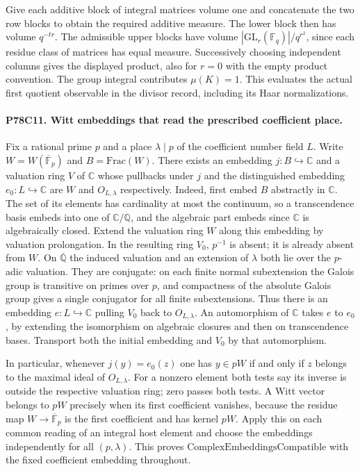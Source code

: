 Give each additive block of integral matrices volume one and concatenate
the two row blocks to obtain the required additive measure. The lower
block then has volume $q^{-tr}$. The admissible upper blocks have
volume $|\mathrm{GL}_r(\mathbb F_q)|/q^{r^2}$, since each residue
class of matrices has equal measure. Successively choosing independent
columns gives the displayed product, also for $r=0$ with the empty
product convention. The group integral contributes $\mu(K)=1$.
This evaluates the actual first quotient observable in the divisor
record, including its Haar normalizations.

\paragraph{P78C11. Witt embeddings that read the prescribed coefficient place.}
Fix a rational prime $p$ and a place $\lambda\mid p$ of the coefficient
number field $L$. Write $W=W(\overline{\mathbb F}_p)$ and $B=\mathrm{Frac}(W)$.
There exists an embedding $j:B\hookrightarrow\mathbb C$ and a valuation
ring $V$ of $\mathbb C$ whose pullbacks under $j$ and the distinguished
embedding $e_0:L\hookrightarrow\mathbb C$ are $W$ and $O_{L,\lambda}$
respectively. Indeed, first embed $B$ abstractly in $\mathbb C$.
The set of its elements has cardinality at most the continuum, so a
transcendence basis embeds into one of $\mathbb C/\mathbb Q$, and the
algebraic part embeds since $\mathbb C$ is algebraically closed. Extend
the valuation ring $W$ along this embedding by valuation prolongation.
In the resulting ring $V_0$, $p^{-1}$ is absent; it is already absent
from $W$. On $\overline{\mathbb Q}$ the induced valuation and an
extension of $\lambda$ both lie over the $p$-adic valuation. They
are conjugate: on each finite normal subextension the Galois group is
transitive on primes over $p$, and compactness of the absolute Galois
group gives a single conjugator for all finite subextensions. Thus
there is an embedding $e:L\hookrightarrow\mathbb C$ pulling $V_0$
back to $O_{L,\lambda}$. An automorphism of $\mathbb C$ takes $e$ to
$e_0$, by extending the isomorphism on algebraic closures and then on
transcendence bases. Transport both the initial embedding and $V_0$
by that automorphism.

In particular, whenever $j(y)=e_0(z)$ one has
$y\in pW$ if and only if $z$ belongs to the maximal ideal of
$O_{L,\lambda}$. For a nonzero element both tests say its inverse is
outside the respective valuation ring; zero passes both tests. A Witt
vector belongs to $pW$ precisely when its first coefficient vanishes,
because the residue map $W\to\overline{\mathbb F}_p$ is the first
coefficient and has kernel $pW$. Apply this on each common reading of
an integral host element and choose the embeddings independently for
all $(p,\lambda)$. This proves $\mathrm{ComplexEmbeddingsCompatible}$
with the fixed coefficient embedding throughout.

